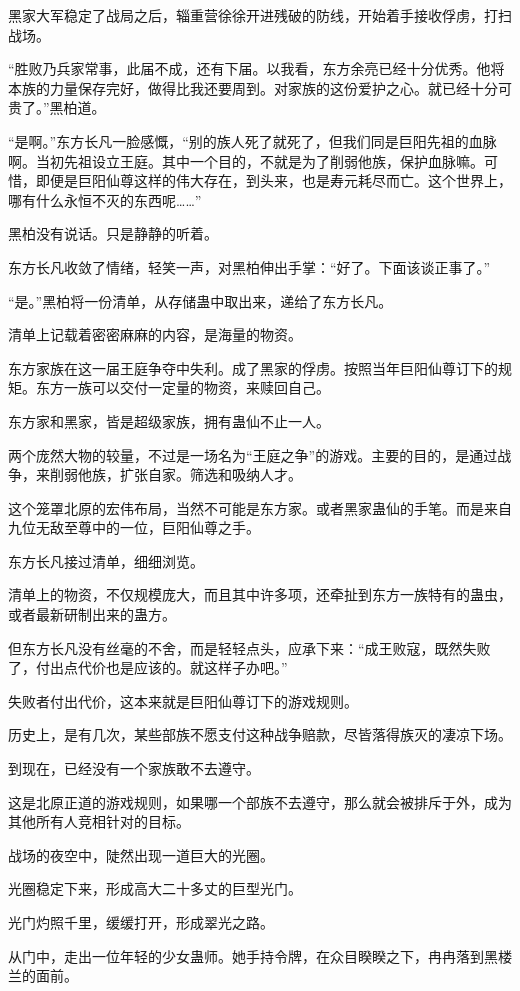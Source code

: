 \begin{this_body}
黑家大军稳定了战局之后，辎重营徐徐开进残破的防线，开始着手接收俘虏，打扫战场。

“胜败乃兵家常事，此届不成，还有下届。以我看，东方余亮已经十分优秀。他将本族的力量保存完好，做得比我还要周到。对家族的这份爱护之心。就已经十分可贵了。”黑柏道。

“是啊。”东方长凡一脸感慨，“别的族人死了就死了，但我们同是巨阳先祖的血脉啊。当初先祖设立王庭。其中一个目的，不就是为了削弱他族，保护血脉嘛。可惜，即便是巨阳仙尊这样的伟大存在，到头来，也是寿元耗尽而亡。这个世界上，哪有什么永恒不灭的东西呢……”

黑柏没有说话。只是静静的听着。

东方长凡收敛了情绪，轻笑一声，对黑柏伸出手掌：“好了。下面该谈正事了。”

“是。”黑柏将一份清单，从存储蛊中取出来，递给了东方长凡。

清单上记载着密密麻麻的内容，是海量的物资。

东方家族在这一届王庭争夺中失利。成了黑家的俘虏。按照当年巨阳仙尊订下的规矩。东方一族可以交付一定量的物资，来赎回自己。

东方家和黑家，皆是超级家族，拥有蛊仙不止一人。

两个庞然大物的较量，不过是一场名为“王庭之争”的游戏。主要的目的，是通过战争，来削弱他族，扩张自家。筛选和吸纳人才。

这个笼罩北原的宏伟布局，当然不可能是东方家。或者黑家蛊仙的手笔。而是来自九位无敌至尊中的一位，巨阳仙尊之手。

东方长凡接过清单，细细浏览。

清单上的物资，不仅规模庞大，而且其中许多项，还牵扯到东方一族特有的蛊虫，或者最新研制出来的蛊方。

但东方长凡没有丝毫的不舍，而是轻轻点头，应承下来：“成王败寇，既然失败了，付出点代价也是应该的。就这样子办吧。”

失败者付出代价，这本来就是巨阳仙尊订下的游戏规则。

历史上，是有几次，某些部族不愿支付这种战争赔款，尽皆落得族灭的凄凉下场。

到现在，已经没有一个家族敢不去遵守。

这是北原正道的游戏规则，如果哪一个部族不去遵守，那么就会被排斥于外，成为其他所有人竞相针对的目标。

战场的夜空中，陡然出现一道巨大的光圈。

光圈稳定下来，形成高大二十多丈的巨型光门。

光门灼照千里，缓缓打开，形成翠光之路。

从门中，走出一位年轻的少女蛊师。她手持令牌，在众目睽睽之下，冉冉落到黑楼兰的面前。


\end{this_body}
